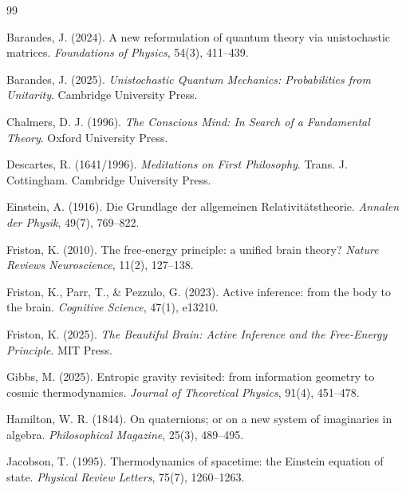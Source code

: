 \documentclass[12pt,a4paper]{article}
\theoremstyle{plain}
\begin{document}
\begin{thebibliography}{99}

Barandes, J. (2024).
\newblock A new reformulation of quantum theory via unistochastic matrices.
\newblock \emph{Foundations of Physics}, 54(3), 411–439.

Barandes, J. (2025).
\newblock \emph{Unistochastic Quantum Mechanics: Probabilities from Unitarity}.
\newblock Cambridge University Press.

Chalmers, D. J. (1996).
\newblock \emph{The Conscious Mind: In Search of a Fundamental Theory}.
\newblock Oxford University Press.

Descartes, R. (1641/1996).
\newblock \emph{Meditations on First Philosophy}.
\newblock Trans. J. Cottingham. Cambridge University Press.

Einstein, A. (1916).
\newblock Die Grundlage der allgemeinen Relativitätstheorie.
\newblock \emph{Annalen der Physik}, 49(7), 769–822.

Friston, K. (2010).
\newblock The free‐energy principle: a unified brain theory?
\newblock \emph{Nature Reviews Neuroscience}, 11(2), 127–138.

Friston, K., Parr, T., & Pezzulo, G. (2023).
\newblock Active inference: from the body to the brain.
\newblock \emph{Cognitive Science}, 47(1), e13210.

Friston, K. (2025).
\newblock \emph{The Beautiful Brain: Active Inference and the Free-Energy Principle}.
\newblock MIT Press.

Gibbs, M. (2025).
\newblock Entropic gravity revisited: from information geometry to cosmic thermodynamics.
\newblock \emph{Journal of Theoretical Physics}, 91(4), 451–478.

Hamilton, W. R. (1844).
\newblock On quaternions; or on a new system of imaginaries in algebra.
\newblock \emph{Philosophical Magazine}, 25(3), 489–495.

Jacobson, T. (1995).
\newblock Thermodynamics of spacetime: the Einstein equation of state.
\newblock \emph{Physical Review Letters}, 75(7), 1260–1263.


\end{thebibliography}
\end{document}
